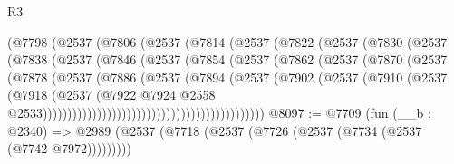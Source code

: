\begin{lexlean}{R3}
\begin{coremodule}
                            (@7798
                              (@2537
                                (@7806
                                  (@2537
                                    (@7814
                                      (@2537
                                        (@7822
                                          (@2537
                                            (@7830
                                              (@2537
                                                (@7838
                                                  (@2537
                                                    (@7846
                                                      (@2537
                                                        (@7854
                                                          (@2537
                                                            (@7862
                                                              (@2537
                                                                (@7870
                                                                  (@2537
                                                                    (@7878
                                                                      (@2537
                                                                        (@7886
                                                                          (@2537
                                                                            (@7894
                                                                              (@2537
                                                                                (@7902
                                                                                  (@2537
                                                                                    (@7910
                                                                                      (@2537
                                                                                        (@7918
                                                                                          (@2537
                                                                                            (@7922
                                                                                              @7924
                                                                                              @2558
                                                                                              @2533)))))))))))))))))))))))))))))))))))))))))))))
@8097 := @7709
    (fun (__b : @2340) =>
    @2989 (@2537 (@7718 (@2537 (@7726 (@2537 (@7734 (@2537 (@7742 @7972)))))))))

\end{coremodule}
\end{lexlean}
